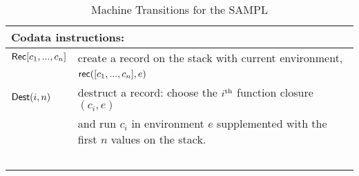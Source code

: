 \documentclass[11pt]{article}
\newcommand{\<}{\langle}
\renewcommand{\>}{\rangle}
\begin{document}
\begin{table}[!h]
\begin{center}
\begin{tabular}{|l|l|}
 \multicolumn{2}{|l|}{Codata instructions:} \\ \hline
  ${\sf Rec}[c_1,...,c_n]$      &         create a record on the stack with current environment, \\
                                            & ${\sf rec}([c_1,...,c_n],e)$  \\
 ${\sf Dest}(i,n)$ &             destruct a record: choose the $i^{\rm th}$  function closure $(c_i,e)$  \\
                        &  and run $c_i$ in environment $e$ supplemented with the first $n$ values on the stack. \\
~ & ~ \\ \hline
\end{tabular}
\caption{Machine Transitions for the SAMPL}
\label{SeqCommTable}
\end{center}
\end{table}
\end{document}
